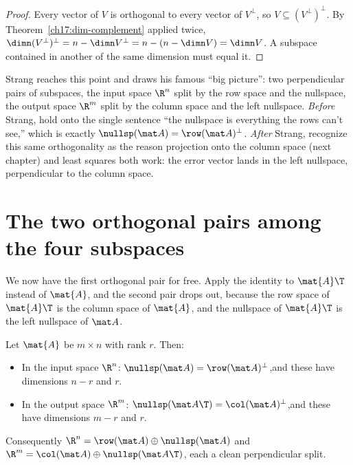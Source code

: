 \begin{proof}
Every vector of $V$ is orthogonal to every vector of $V^\perp$, so $V\subseteq (V^\perp)^\perp$.
By Theorem~\ref{ch17:dim-complement} applied twice, $\dimn (V^\perp)^\perp = n-\dimn V^\perp
= n-(n-\dimn V)=\dimn V$. A subspace contained in another of the same dimension must equal it.
\end{proof}

\begin{strangbox}
Strang reaches this point and draws his famous ``big picture'': two perpendicular pairs of
subspaces, the input space $\R^n$ split by the row space and the nullspace, the output space
$\R^m$ split by the column space and the left nullspace. \emph{Before} Strang, hold onto the
single sentence ``the nullspace is everything the rows can't see,'' which is exactly
$\nullsp(\mat A)=\row(\mat A)^\perp$. \emph{After} Strang, recognize this same orthogonality as the
reason projection onto the column space (next chapter) and least squares both work: the error
vector lands in the left nullspace, perpendicular to the column space.
\end{strangbox}

\section{The two orthogonal pairs among the four subspaces}

We now have the first orthogonal pair for free. Apply the identity to $\mat{A}\T$ instead of
$\mat{A}$, and the second pair drops out, because the row space of $\mat{A}\T$ is the column space
of $\mat{A}$, and the nullspace of $\mat{A}\T$ is the left nullspace of $\mat A$.

\begin{theorem}\label{ch17:two-pairs}
Let $\mat{A}$ be $m\times n$ with rank $r$. Then:
\begin{itemize}
  \item In the input space $\R^n$:\quad
        $\nullsp(\mat A) = \row(\mat A)^{\perp}$,\quad and these have dimensions $n-r$ and $r$.
  \item In the output space $\R^m$:\quad
        $\nullsp(\mat A\T) = \col(\mat A)^{\perp}$,\quad and these have dimensions $m-r$ and $r$.
\end{itemize}
Consequently $\R^n = \row(\mat A)\oplus\nullsp(\mat A)$ and
$\R^m = \col(\mat A)\oplus\nullsp(\mat A\T)$, each a clean perpendicular split.
\end{theorem}


